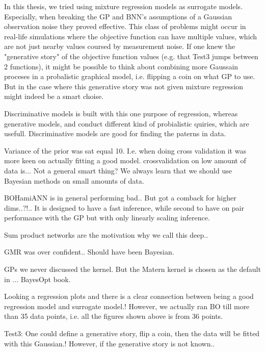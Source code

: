 In this thesis, we tried using mixture regression models as surrogate models. Especially, when breaking the 
GP and BNN's assumptions of a Gaussian observation noise they proved effective. This class of problems
might occur in real-life simulations where the objective function can have multiple values, which are not
just nearby values coursed by measurement noise. If one knew the "generative story" of the
objective function values (e.g. that Test3 jumps between 2 functions), it might be possible to think about combining more Gaussain proceses in a probalistic
graphical model, i.e. flipping a coin on what GP to use. But in the case where this generative story was not given 
mixture regression might indeed be a smart choise. 

Discriminative models is built with this one purpose of regression, whereas generative models, and conduct different 
kind of probialistic quiries, which are usefull. Discriminative models are good for finding the paterns in data. 

Variance of the prior was sat equal 10. I.e. when doing cross validation it was more keen on actually fitting a good model. 
crossvalidation on low amount of data is... Not a general smart thing? We always learn that we should use Bayesian methods 
on small amounts of data. 

BOHamiANN is in general performing bad.. But got a comback for higher dims..?!.. It is designed to
have a fast inference, while second to have on pair performance with the GP but with only linearly
scaling inference.

Sum product networks are the motivation why we call this deep.. 

GMR was over confident.. Should have been Bayesian.

GPs we never discussed the kernel. But the Matern kernel is chosen as the default in ... BayesOpt book. 

Looking a regression plots and there is a clear connection between being a good regression
model and surrogate model.! However, we actually ran BO till more than 35 data points, i.e. 
all the figures shown above is from 36 points. 


Test3: One could define a generative story, flip a coin, then the data will
be fitted with this Gaussian.! However, if the generative story is not known..

